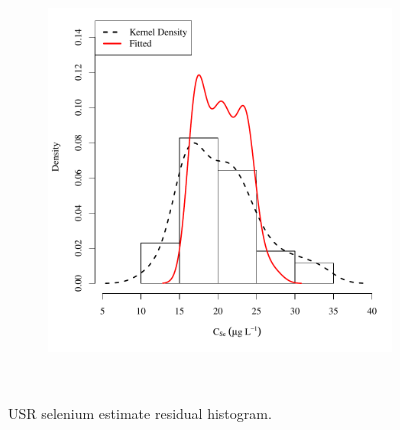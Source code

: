 \begin{linenumbers}
\begin{landscape}
\begin{figure}
\begin{subfigure}{0.7\textwidth}
			\includegraphics[width=\tableCustomSize]{"Figures/Results_USR/Stochastic/Conc Model ResDist WTP"}
		\end{subfigure}\\
		\caption{USR selenium estimate residual histogram.}
	\end{figure}
\end{landscape}


\end{linenumbers}
